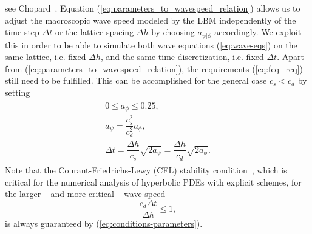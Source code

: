 \documentclass{article}
\begin{document}
see Chopard~\cite{chopard_lattice_1999}.
Equation (\ref{eq:parameters_to_wavespeed_relation}) allows us to adjust the macroscopic wave speed modeled by the LBM independently of the time step $\Delta{t}$ or the lattice spacing $\Delta{h}$ by choosing $a_{\psi\vert\phi}$ accordingly. We exploit this in order to be able to simulate both wave equations (\ref{eq:wave-eqs}) on the same lattice, i.e. fixed $\Delta{h}$, and the same time discretization, i.e. fixed $\Delta{t}$. Apart from (\ref{eq:parameters_to_wavespeed_relation}), the requirements (\ref{eq:feq_req}) still need to be fulfilled.
This can be accomplished for the general case $c_s<c_d$ by setting 
\begin{align}
\begin{split}
0\le{a_{\phi}}\le0.25, \\
a_{\psi} = \dfrac{c_s^2}{c_d^2}a_{\phi},\\
\Delta{t} = \dfrac{\Delta{h}}{c_s}\sqrt{2a_\psi}= \dfrac{\Delta{h}}{c_d}\sqrt{2a_\phi}.
\end{split}
\label{eq:conditions-parameters}
\end{align}
Note that the Courant-Friedrichs-Lewy (CFL) stability condition~\cite{Courant_1928}, which is critical for the numerical analysis of hyperbolic PDEs with explicit schemes, for the larger -- and more critical -- wave speed
\begin{equation}
    \dfrac{c_d\Delta{t}}{\Delta{h}} \le{1},
\end{equation}
is always guaranteed by (\ref{eq:conditions-parameters}).
\end{document}
